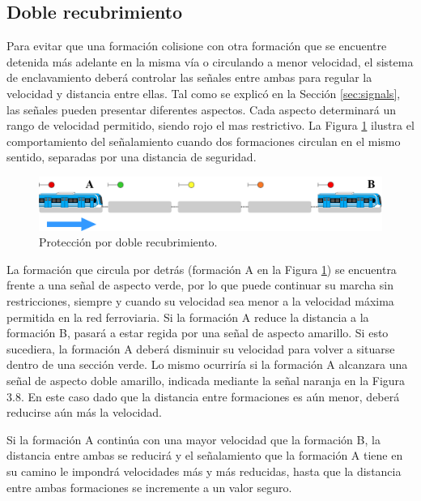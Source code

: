 \subsection{Doble recubrimiento}
	\label{sec:function_5}
	
	Para evitar que una formación colisione con otra formación que se encuentre detenida más adelante en la misma vía o circulando a menor velocidad, el sistema de enclavamiento deberá controlar las señales entre ambas para regular la velocidad y distancia entre ellas. Tal como se explicó en la Sección \ref{sec:signals}, las señales pueden presentar diferentes aspectos. Cada aspecto determinará un rango de velocidad permitido, siendo rojo el mas restrictivo. La Figura \ref{fig:ACG_recrubrimiento_1} ilustra el comportamiento del señalamiento cuando dos formaciones circulan en el mismo sentido, separadas por una distancia de seguridad.
	
	\begin{figure}[!h]
		\centering
		\includegraphics[width=1\textwidth]{Figuras/recubrimiento}
		\centering\caption{Protección por doble recubrimiento.}
		\label{fig:ACG_recrubrimiento_1}
	\end{figure}
	
	La formación que circula por detrás (formación A en la Figura \ref{fig:ACG_recrubrimiento_1}) se encuentra frente a una señal de aspecto verde, por lo
	que puede continuar su marcha sin restricciones, siempre y cuando su velocidad sea menor a la velocidad máxima permitida en la red ferroviaria. Si la formación A reduce la distancia a la formación B, pasará a estar regida por una señal de aspecto amarillo. Si esto sucediera, la formación A deberá disminuir su velocidad para volver a situarse dentro de una sección verde. Lo mismo ocurriría si la formación A alcanzara una señal de aspecto doble amarillo, indicada mediante la señal naranja en la Figura 3.8. En este caso dado que la distancia entre formaciones es aún menor, deberá reducirse aún más la velocidad.
	
	Si la formación A continúa con una mayor velocidad que la formación B, la distancia entre ambas se reducirá y el señalamiento que la formación A tiene en su camino le impondrá velocidades más y más reducidas, hasta que la distancia entre ambas formaciones se incremente a un valor seguro.
		
